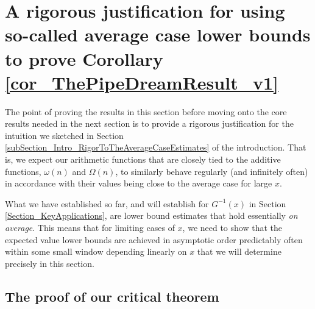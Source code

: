 \documentclass[11pt,reqno,a4letter]{article}
\numberwithin{figure}{section}
\numberwithin{table}{section}
\theoremstyle{plain}
\numberwithin{theorem}{section}
\theoremstyle{definition}
\begin{document}
\newpage 
\section{A rigorous justification for using so-called average case lower bounds to prove 
         Corollary \ref{cor_ThePipeDreamResult_v1}} 
\label{Section_ProofOfValidityOfAverageOrderLowerBounds} 

The point of proving the results in this section before moving onto the core results needed in 
the next section is to provide a rigorous justification for the intuition we sketched in 
Section \ref{subSection_Intro_RigorToTheAverageCaseEstimates} of the introduction. 
That is, we expect our arithmetic functions that are closely 
tied to the additive functions, $\omega(n)$ and $\Omega(n)$, to similarly behave regularly (and 
infinitely often) in accordance with their values being close to the average case for large $x$. 

What we have established so far, and will establish for $G^{-1}(x)$ in 
Section \ref{Section_KeyApplications}, are lower bound estimates that hold essentially 
\emph{on average}. 
This means that for limiting cases of $x$, we need to show that the expected value lower bounds 
are achieved in asymptotic order predictably often 
within some small window depending linearly on $x$ that we will determine precisely in this section. 

\subsection{The proof of our critical theorem} 
\end{document}
